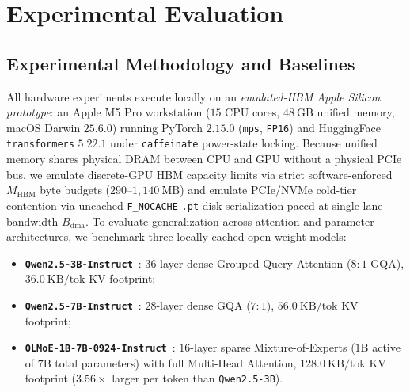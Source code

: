 \documentclass[10pt,journal,compsoc]{IEEEtran}
\theoremstyle{definition}
\theoremstyle{remark}
\begin{document}
\section{Experimental Evaluation}\label{sec:eval}

\subsection{Experimental Methodology and Baselines}
All hardware experiments execute locally on an \emph{emulated-HBM Apple Silicon prototype}: an Apple M5 Pro workstation ($15$ CPU cores, $48~\mathrm{GB}$ unified memory, macOS Darwin $25.6.0$) running PyTorch $2.15.0$ (\texttt{mps}, \texttt{FP16}) and HuggingFace \texttt{transformers} $5.22.1$ under \texttt{caffeinate} power-state locking. Because unified memory shares physical DRAM between CPU and GPU without a physical PCIe bus, we emulate discrete-GPU HBM capacity limits via strict software-enforced $M_{\mathrm{HBM}}$ byte budgets ($290$--$1{,}140~\mathrm{MB}$) and emulate PCIe/NVMe cold-tier contention via uncached \texttt{F\_NOCACHE} \texttt{.pt} disk serialization paced at single-lane bandwidth $B_{\mathrm{dma}}$. To evaluate generalization across attention and parameter architectures, we benchmark three locally cached open-weight models:
\begin{itemize}
\item \textbf{\texttt{Qwen2.5-3B-Instruct}}~\cite{qwen2025qwen25}: $36$-layer dense Grouped-Query Attention ($8{:}1$ GQA), $36.0~\mathrm{KB/tok}$ KV footprint;
\item \textbf{\texttt{Qwen2.5-7B-Instruct}}~\cite{qwen2025qwen25}: $28$-layer dense GQA ($7{:}1$), $56.0~\mathrm{KB/tok}$ KV footprint;
\item \textbf{\texttt{OLMoE-1B-7B-0924-Instruct}}~\cite{muennighoff2025olmoe}: $16$-layer sparse Mixture-of-Experts ($1\mathrm{B}$ active of $7\mathrm{B}$ total parameters) with full Multi-Head Attention, $128.0~\mathrm{KB/tok}$ KV footprint ($3.56\times$ larger per token than \texttt{Qwen2.5-3B}).
\end{itemize}
\end{document}
